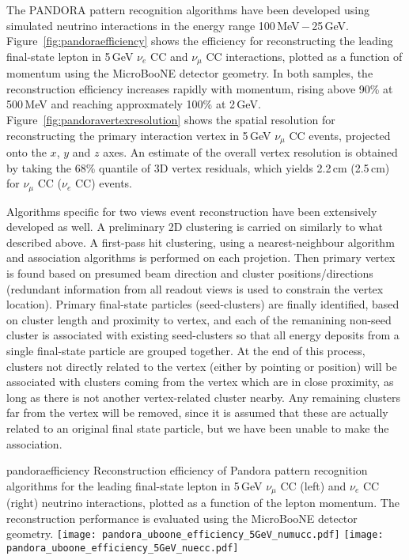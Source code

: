 The PANDORA pattern recognition algorithms have been developed
using simulated neutrino interactions in the energy range 100\,MeV\,$-$\,25\,GeV.
Figure~\ref{fig:pandoraefficiency} shows the efficiency for reconstructing
the leading final-state lepton in 5\,GeV $\nu_{e}$ CC and $\nu_{\mu}$ CC interactions,
plotted as a function of momentum using the MicroBooNE detector geometry.
In both samples, the reconstruction efficiency increases rapidly with momentum,
rising above 90\% at 500\,MeV and reaching approxmately 100\% at 2\,GeV.
Figure~\ref{fig:pandoravertexresolution} shows the spatial resolution for
reconstructing the primary interaction vertex in 5\,GeV $\nu_{\mu}$ CC events,
projected onto the $x$, $y$ and $z$ axes. An estimate of the overall vertex 
resolution is obtained by taking the 68\% quantile of 3D vertex residuals, 
which yields 2.2\,cm (2.5\,cm) for $\nu_{\mu}$ CC ($\nu_{e}$ CC) events.



Algorithms specific for two views event reconstruction have been extensively developed as well. 
A preliminary 2D clustering is carried on similarly to what described above.
A first-pass hit clustering, using a nearest-neighbour algorithm and association algorithms is performed
on each projetion. Then primary vertex is found based on presumed beam direction and cluster positions/directions
(redundant information from all readout views is used to constrain the vertex location).
Primary final-state particles (seed-clusters) are finally identified, based on cluster length and proximity to vertex,
and each of the remanining non-seed cluster is associated with existing seed-clusters so that all energy deposits from a single final-state particle are grouped together.
At the end of this process, clusters not directly related to the vertex (either by pointing or position) 
will be associated with clusters coming from the vertex which are in close proximity, 
as long as there is not another vertex-related cluster nearby. 
Any remaining clusters far from the vertex will be removed, 
since it is assumed that these are actually related to an original final state particle, but we have been unable to make the association.


\begin{cdrfigure}{pandoraefficiency}
{Reconstruction efficiency of Pandora pattern recognition algorithms
 for the leading final-state lepton in 5\,GeV $\nu_{\mu}$ CC (left) and
 $\nu_{e}$ CC (right) neutrino interactions, plotted as a function of
 the lepton momentum. The reconstruction performance is evaluated
 using the MicroBooNE detector geometry. }
\texttt{[image: pandora\_uboone\_efficiency\_5GeV\_numucc.pdf]}
\texttt{[image: pandora\_uboone\_efficiency\_5GeV\_nuecc.pdf]}
\end{cdrfigure}

